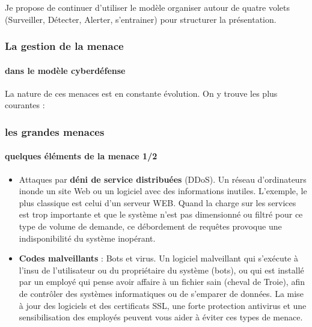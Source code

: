 Je propose de continuer d'utiliser le modèle organiser autour de quatre volets (Surveiller, Détecter, Alerter, s'entrainer)   pour structurer la présentation.
\begin{frame}
\frametitle<presentation>{La gestion de la menace}
\framesubtitle<presentation>{dans le modèle cyberdéfense}
\end{frame}


La nature de ces menaces est en constante évolution.  On y trouve les plus courantes :

\begin{frame}
\frametitle<presentation>{les grandes menaces}
\framesubtitle<presentation>{quelques éléments de la menace 1/2}
\begin{itemize}

\item Attaques par \textbf{déni de service distribuées} (DDoS).  Un réseau d’ordinateurs inonde un site Web ou un logiciel avec des informations inutiles. L'exemple, le plus classique est celui d'un serveur WEB. Quand la charge sur les services est trop importante et que le système n'est pas dimensionné ou filtré pour ce type de volume de demande, ce débordement de requêtes provoque une indisponibilité du système inopérant. 

\item \textbf{Codes malveillants} : Bots et virus. Un logiciel malveillant qui s’exécute à l'insu de l'utilisateur ou du propriétaire du système (bots), ou qui est installé par un employé qui pense avoir affaire à un fichier sain (cheval de Troie), afin de contrôler des systèmes informatiques ou de s’emparer de données. La mise à jour des logiciels et des certificats SSL, une forte protection antivirus et une sensibilisation des employés peuvent vous aider à éviter ces types de menace.
\end{itemize}
\end{frame}



